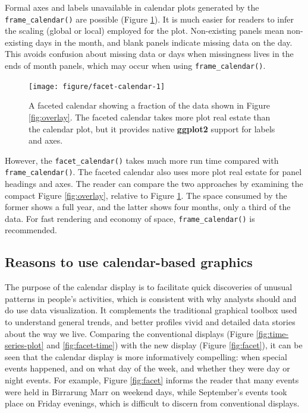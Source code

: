 \documentclass[12pt]{article}
\begin{document}
Formal axes and labels unavailable in calendar plots generated by the \texttt{frame\_calendar()} are possible (Figure \ref{fig:facet-calendar}). It is much easier for readers to infer the scaling (global or local) employed for the plot. Non-existing panels mean non-existing days in the month, and blank panels indicate missing data on the day. This avoids confusion about missing data or days when missingness lives in the ends of month panels, which may occur when using \texttt{frame\_calendar()}.

\begin{figure}

{\centering \texttt{[image: figure/facet-calendar-1]} 

}

\caption{A faceted calendar showing a fraction of the data shown in Figure \ref{fig:overlay}. The faceted calendar takes more plot real estate than the calendar plot, but it provides native \textbf{ggplot2} support for labels and axes.}\label{fig:facet-calendar}
\end{figure}



However, the \texttt{facet\_calendar()} takes much more run time compared with \texttt{frame\_calendar()}. The faceted calendar also uses more plot real estate for panel headings and axes. The reader can compare the two approaches by examining the compact Figure \ref{fig:overlay}, relative to Figure \ref{fig:facet-calendar}. The space consumed by the former shows a full year, and the latter shows four months, only a third of the data. For fast rendering and economy of space, \texttt{frame\_calendar()} is recommended.

\hypertarget{reasons-to-use-calendar-based-graphics}{%
\subsection{Reasons to use calendar-based graphics}\label{reasons-to-use-calendar-based-graphics}}

The purpose of the calendar display is to facilitate quick discoveries of unusual patterns in people's activities, which is consistent with why analysts should and do use data visualization. It complements the traditional graphical toolbox used to understand general trends, and better profiles vivid and detailed data stories about the way we live. Comparing the conventional displays (Figure \ref{fig:time-series-plot} and \ref{fig:facet-time}) with the new display (Figure \ref{fig:facet}), it can be seen that the calendar display is more informatively compelling: when special events happened, and on what day of the week, and whether they were day or night events. For example, Figure \ref{fig:facet} informs the reader that many events were held in Birrarung Marr on weekend days, while September's events took place on Friday evenings, which is difficult to discern from conventional displays.
\end{document}

